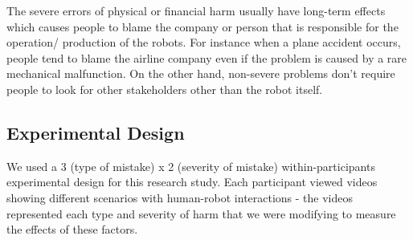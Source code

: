 \documentclass{sigchi}
\begin{document}
The severe errors of physical or financial harm usually have long-term effects which causes people to blame the company or person that is responsible for the operation/ production of the robots. For instance when a plane accident occurs, people tend to blame the airline company even if the problem is caused by a rare mechanical malfunction. On the other hand, non-severe problems don’t require people to look for other stakeholders other than the robot itself.

\subsection{Experimental Design}
We used a 3 (type of mistake) x 2 (severity of mistake)  within-participants experimental design for this research study. Each participant viewed videos showing different scenarios with human-robot interactions - the videos represented each type and severity of harm that we were modifying to measure the effects of these factors.
\end{document}
